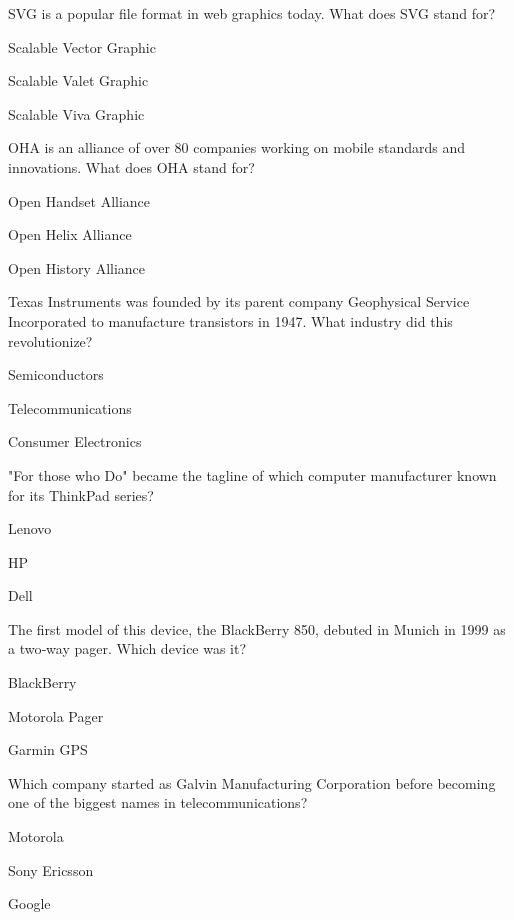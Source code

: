 \begin{enhancedmcq}{SVG is a popular file format in web graphics today. What does SVG stand for?}
\item Scalable Vector Graphic
\item Scalable Valet Graphic
\item Scalable Viva Graphic

\end{enhancedmcq}
\begin{enhancedmcq}{OHA is an alliance of over 80 companies working on mobile standards and innovations. What does OHA stand for?}
\item Open Handset Alliance
\item Open Helix Alliance
\item Open History Alliance

\end{enhancedmcq}
\begin{enhancedmcq}{Texas Instruments was founded by its parent company Geophysical Service Incorporated to manufacture transistors in 1947. What industry did this revolutionize?}
\item Semiconductors
\item Telecommunications
\item Consumer Electronics

\end{enhancedmcq}
\begin{enhancedmcq}{"For those who Do" became the tagline of which computer manufacturer known for its ThinkPad series?}
\item Lenovo
\item HP
\item Dell

\end{enhancedmcq}
\begin{enhancedmcq}{The first model of this device, the BlackBerry 850, debuted in Munich in 1999 as a two‑way pager. Which device was it?}
\item BlackBerry
\item Motorola Pager
\item Garmin GPS

\end{enhancedmcq}
\begin{enhancedmcq}{Which company started as Galvin Manufacturing Corporation before becoming one of the biggest names in telecommunications?}
\item Motorola
\item Sony Ericsson
\item Google

\end{enhancedmcq}

